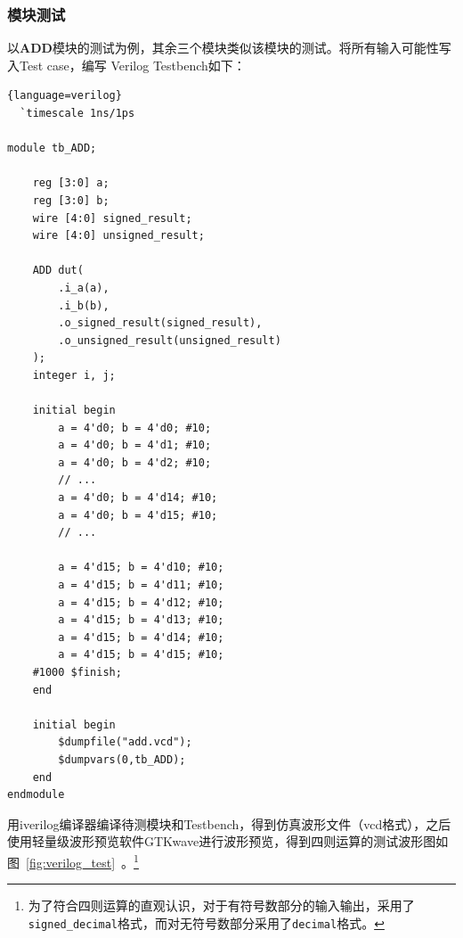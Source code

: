 \documentclass[lang=cn,newtx,10pt,scheme=chinese]{elegantbook}
\begin{document}
\subsubsection{模块测试}
以\textbf{ADD}模块的测试为例，其余三个模块类似该模块的测试。将所有输入可能性写入Test case，编写 Verilog Testbench如下：
\begin{lstlisting}{language=verilog}
  `timescale 1ns/1ps

module tb_ADD;

    reg [3:0] a;
    reg [3:0] b;
    wire [4:0] signed_result;
    wire [4:0] unsigned_result;

    ADD dut(
        .i_a(a),
        .i_b(b),
        .o_signed_result(signed_result),
        .o_unsigned_result(unsigned_result)
    );
    integer i, j;

    initial begin
        a = 4'd0; b = 4'd0; #10;
        a = 4'd0; b = 4'd1; #10;
        a = 4'd0; b = 4'd2; #10;
        // ...
        a = 4'd0; b = 4'd14; #10;
        a = 4'd0; b = 4'd15; #10;
        // ...

        a = 4'd15; b = 4'd10; #10;
        a = 4'd15; b = 4'd11; #10;
        a = 4'd15; b = 4'd12; #10;
        a = 4'd15; b = 4'd13; #10;
        a = 4'd15; b = 4'd14; #10;
        a = 4'd15; b = 4'd15; #10;
    #1000 $finish;
    end

    initial begin
        $dumpfile("add.vcd");
        $dumpvars(0,tb_ADD);
    end
endmodule
\end{lstlisting}
用iverilog编译器编译待测模块和Testbench，得到仿真波形文件（vcd格式），之后使用轻量级波形预览软件GTKwave进行波形预览，得到四则运算的测试波形图如图~\ref{fig:verilog_test}~。\footnote{为了符合四则运算的直观认识，对于有符号数部分的输入输出，采用了\texttt{signed\_decimal}格式，而对无符号数部分采用了\texttt{decimal}格式。}
\end{document}

